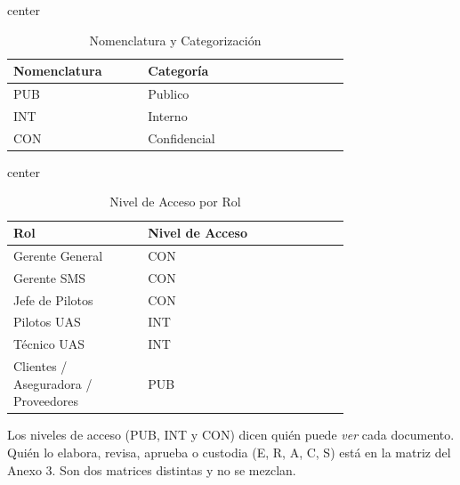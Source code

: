 \begin{table}[H]
\begin{adjustbox}{center}
\begin{tabular}{|>{\centering\arraybackslash}m{0.3\linewidth}|>{\centering\arraybackslash}m{0.45\linewidth}|}
\hline
\rowcolor{gray!20}
\textbf{Nomenclatura} & \textbf{Categoría} \\
\hline

PUB & Publico \\
\hline

INT & Interno \\
\hline

CON & Confidencial \\
\hline

\end{tabular}
\end{adjustbox}
\caption{Nomenclatura y Categorización }
\label{tab:responsabilidades_documentales}
\end{table}

\begin{table}[H]
\begin{adjustbox}{center}
\begin{tabular}{|>{\centering\arraybackslash}m{0.3\linewidth}|>{\centering\arraybackslash}m{0.45\linewidth}|}
\hline
\rowcolor{gray!20}
\textbf{Rol} & \textbf{Nivel de Acceso} \\
\hline

Gerente General & CON \\
\hline

Gerente SMS & CON \\
\hline

Jefe de Pilotos & CON \\
\hline

Pilotos UAS & INT \\
\hline
Técnico UAS & INT \\
\hline

Clientes / Aseguradora / Proveedores & PUB \\
\hline

\end{tabular}
\end{adjustbox}
\caption{Nivel de Acceso por Rol}
\label{tab:responsabilidades_documentales}
\end{table}

Los niveles de acceso (PUB, INT y CON) dicen quién puede \textit{ver} cada documento. Quién lo elabora, revisa, aprueba o custodia (E, R, A, C, S) está en la matriz del Anexo 3. Son dos matrices distintas y no se mezclan.

